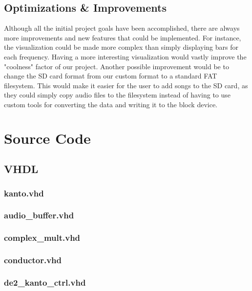 \documentclass{article}
\begin{document}
\subsection{Optimizations \& Improvements}

Although all the initial project goals have been accomplished, there are always 
more improvements and new features that could be implemented.
For instance, the visualization could be made more complex than simply 
displaying bars for each frequency. Having a more interesting visualization 
would vastly improve the "coolness" factor of our project. Another possible 
improvement would be to change the SD card format from our custom format to a 
standard FAT filesystem. This would make it easier for the user to add songs to 
the SD card, as they could simply copy audio files to the filesystem instead of 
having to use custom tools for converting the data and writing it to the block 
device.

\newpage
\appendix

\section{Source Code}
\subsection{VHDL}
	\subsubsection{kanto.vhd}
	
	\subsubsection{audio\_buffer.vhd}
	
	\subsubsection{complex\_mult.vhd}
	
	\subsubsection{conductor.vhd}
	
	\subsubsection{de2\_kanto\_ctrl.vhd}
	
\end{document}
